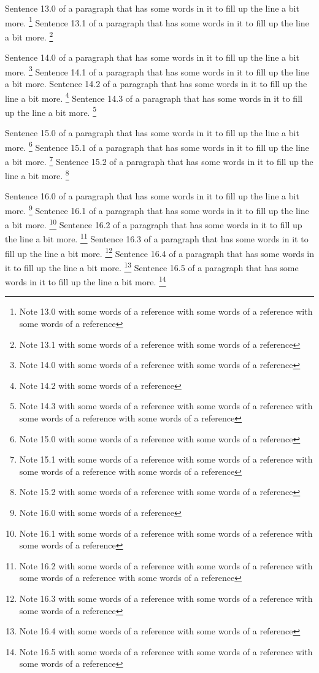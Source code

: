 Sentence 13.0 of a paragraph that has some words in it to fill up the line a bit more. \footnote{Note 13.0 with some words of a reference with some words of a reference with some words of a reference} Sentence 13.1 of a paragraph that has some words in it to fill up the line a bit more. \footnote{Note 13.1 with some words of a reference with some words of a reference}

Sentence 14.0 of a paragraph that has some words in it to fill up the line a bit more. \footnote{Note 14.0 with some words of a reference with some words of a reference} Sentence 14.1 of a paragraph that has some words in it to fill up the line a bit more. Sentence 14.2 of a paragraph that has some words in it to fill up the line a bit more. \footnote{Note 14.2 with some words of a reference} Sentence 14.3 of a paragraph that has some words in it to fill up the line a bit more. \footnote{Note 14.3 with some words of a reference with some words of a reference with some words of a reference with some words of a reference}

Sentence 15.0 of a paragraph that has some words in it to fill up the line a bit more. \footnote{Note 15.0 with some words of a reference with some words of a reference} Sentence 15.1 of a paragraph that has some words in it to fill up the line a bit more. \footnote{Note 15.1 with some words of a reference with some words of a reference with some words of a reference with some words of a reference} Sentence 15.2 of a paragraph that has some words in it to fill up the line a bit more. \footnote{Note 15.2 with some words of a reference with some words of a reference}

Sentence 16.0 of a paragraph that has some words in it to fill up the line a bit more. \footnote{Note 16.0 with some words of a reference} Sentence 16.1 of a paragraph that has some words in it to fill up the line a bit more. \footnote{Note 16.1 with some words of a reference with some words of a reference with some words of a reference} Sentence 16.2 of a paragraph that has some words in it to fill up the line a bit more. \footnote{Note 16.2 with some words of a reference with some words of a reference with some words of a reference with some words of a reference} Sentence 16.3 of a paragraph that has some words in it to fill up the line a bit more. \footnote{Note 16.3 with some words of a reference with some words of a reference with some words of a reference} Sentence 16.4 of a paragraph that has some words in it to fill up the line a bit more. \footnote{Note 16.4 with some words of a reference with some words of a reference} Sentence 16.5 of a paragraph that has some words in it to fill up the line a bit more. \footnote{Note 16.5 with some words of a reference with some words of a reference with some words of a reference}

